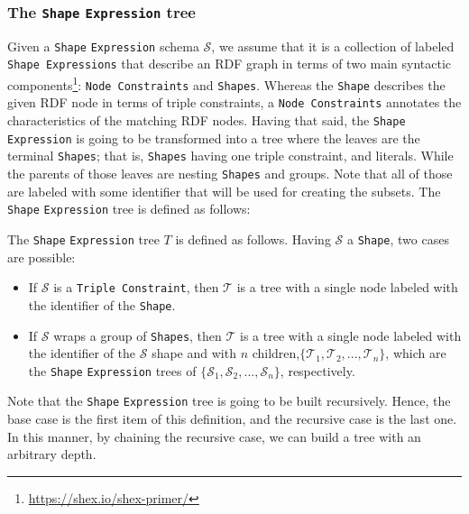 \subsubsection{The \texttt{Shape} \texttt{Expression} tree}

Given a \texttt{Shape} \texttt{Expression} schema $\mathcal{S}$, we assume that it is a collection of labeled \texttt{Shape Expressions} that describe an RDF graph in terms of two main syntactic components\footnote{\url{https://shex.io/shex-primer/}}: \texttt{Node Constraints} and \texttt{Shapes}. Whereas the \texttt{Shape} describes the given RDF node in terms of triple constraints, a \texttt{Node Constraints} annotates the characteristics of the matching RDF nodes. Having that said, the \texttt{Shape} \texttt{Expression} is going to be transformed into a tree where the leaves are the terminal \texttt{Shapes}; that is, \texttt{Shapes} having one triple constraint, and literals. While the parents of those leaves are nesting \texttt{Shapes} and groups. Note that all of those are labeled with some identifier that will be used for creating the subsets. The \texttt{Shape} \texttt{Expression} tree is defined as follows:

\begin{definition}
    The \texttt{Shape} \texttt{Expression} tree $T$ is defined as follows. Having $\mathcal{S}$ a \texttt{Shape}, two cases are possible:

    \begin{itemize}
        \itemsep0.5em
        \item If $\mathcal{S}$ is a \texttt{Triple Constraint}, then $\mathcal{T}$ is a tree with a single node labeled with the identifier of the \texttt{Shape}.
        \item If $\mathcal{S}$ wraps a group of \texttt{Shapes}, then $\mathcal{T}$ is a tree with a single node labeled with the identifier of the $\mathcal{S}$ shape and with $n$ children,$\{\mathcal{T}_1, \mathcal{T}_2, ..., \mathcal{T}_n\}$, which are the \texttt{Shape} \texttt{Expression} trees of $\{\mathcal{S}_1, \mathcal{S}_2, ..., \mathcal{S}_n\}$, respectively.
    \end{itemize}

    Note that the \texttt{Shape} \texttt{Expression} tree is going to be built recursively. Hence, the base case is the first item of this definition, and the recursive case is the last one. In this manner, by chaining the recursive case, we can build a tree with an arbitrary depth.
\end{definition}


